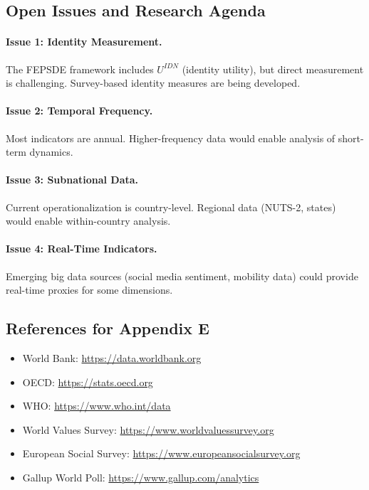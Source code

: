 \subsection{Open Issues and Research Agenda}
\label{sec:E-openissues}

\paragraph{Issue 1: Identity Measurement.}
The FEPSDE framework includes $U^{IDN}$ (identity utility), but direct
measurement is challenging. Survey-based identity measures are being developed.

\paragraph{Issue 2: Temporal Frequency.}
Most indicators are annual. Higher-frequency data would enable
analysis of short-term dynamics.

\paragraph{Issue 3: Subnational Data.}
Current operationalization is country-level. Regional data (NUTS-2, states)
would enable within-country analysis.

\paragraph{Issue 4: Real-Time Indicators.}
Emerging big data sources (social media sentiment, mobility data) could
provide real-time proxies for some dimensions.


\subsection{References for Appendix E}
\label{sec:E-references}

\begin{itemize}[nosep]
    \item World Bank: \url{https://data.worldbank.org}
    \item OECD: \url{https://stats.oecd.org}
    \item WHO: \url{https://www.who.int/data}
    \item World Values Survey: \url{https://www.worldvaluessurvey.org}
    \item European Social Survey: \url{https://www.europeansocialsurvey.org}
    \item Gallup World Poll: \url{https://www.gallup.com/analytics}
\end{itemize}

